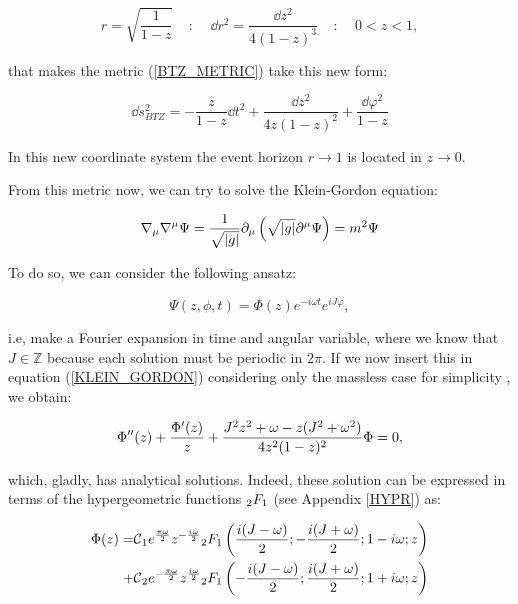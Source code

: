 \documentclass[11pt,a4paper]{article}
\begin{document}
\begin{equation}
    r = \sqrt{\frac{1}{1-z}} ~~~~~:~~~~~ \dd r^2 = \frac{\dd z^2}{4(1-z)^3} ~~~~~:~~~~~ 0 < z < 1,
\end{equation}

{\noindent that makes the metric (\ref{BTZ_METRIC}) take this new form:}

\begin{equation}
    \dd s^2_{BTZ} = -\frac{z}{1-z}\dd t^2 + \frac{\dd z^2 }{4z(1-z)^2} + \frac{\dd\varphi^2}{1-z}
\end{equation}

{\noindent In this new coordinate system the event horizon $r\rightarrow 1$ is located in $z\rightarrow 0$.}

From this metric now, we can try to solve the Klein-Gordon equation:

\begin{equation}\LA{KLEIN_GORDON}
    \nabla_\mu\nabla^\mu \Psi =\frac{1}{\sqrt{\abs{g}}}\del_\mu\left(\sqrt{\abs{g}}\del^\mu\Psi\right)= m^2\Psi
\end{equation}

{\noindent To do so, we can consider the following ansatz: }

\begin{equation}
    \Psi(z,\phi,t) = \Phi(z)e^{-i\omega t}e^{iJ\varphi},
\end{equation}

{\noindent i.e, make a Fourier expansion in time and angular variable, where we know that $J\in\mathds{Z}$ because each solution must be periodic in $2\pi$. If we now insert this in equation (\ref{KLEIN_GORDON}) considering only the massless case for simplicity \cite{Jeong_2025,Das_2023,das2023fuzzballsrandommatrices}, we obtain:}

\begin{equation}
    \Phi''(z) + \frac{\Phi'(z)}{z} + \frac{J^2z^2+\omega-z(J^2+\omega^2)}{4z^2(1-z)^2}\Phi=0,
\end{equation}

which, gladly, has analytical solutions. Indeed, these solution can be expressed in terms of the hypergeometric functions ${}_2F_1$ (see Appendix \ref{HYPR}) as:

\begin{equation}\LA{SOL_BTZ}
    \begin{aligned}
        \Phi(z) = & \calc_1 e^{\frac{\pi\w}{2}} z^{-\frac{i\w}{2}}\hypr\left(\frac{i(J-\w)}{2};-\frac{i(J+\w)}{2};1-i\w;z\right) \\
    + & \calc_2 e^{-\frac{\pi\w}{2}} z^{\frac{i\w}{2}}\hypr\left(-\frac{i(J-\w)}{2};\frac{i(J+\w)}{2};1+i\w;z\right)
\end{aligned}
\end{equation}
\end{document}
